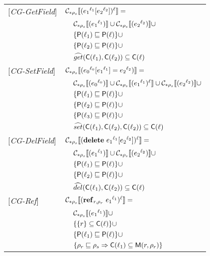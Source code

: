 \documentclass[[12pt,a4paper,twoside,openrigh]{report}
\begin{document}
\newpage
\begin{tabular} {l l l l}
{[\textit{CG-GetField}]}&\multicolumn{3}{l}{$\mathcal{C}_{*\rho_s}\llbracket ({e_1}^{\ell_1}[{e_2}^{\ell_2}])^\ell \rrbracket = $}\\
&&\multicolumn{2}{l}{$ \mathcal{C}_{*\rho_s}\llbracket ({e_1}^{\ell_1}) \rrbracket \cup \mathcal{C}_{*\rho_s}\llbracket ({e_2}^{\ell_2}) \rrbracket \cup$}\\
&&\multicolumn{2}{l}{$\{ \mathsf{P}(\ell_1) \sqsubseteq \mathsf{P}(\ell) \} \cup$} \\
&&\multicolumn{2}{l}{$\{ \mathsf{P}(\ell_2) \sqsubseteq \mathsf{P}(\ell) \} \cup$} \\
&&\multicolumn{2}{l}{$\widehat{get} (\mathsf{C}(\ell_1), \mathsf{C}(\ell_2)) \subseteq \mathsf{C}(\ell)$} \\
{[\textit{CG-SetField}]}&\multicolumn{3}{l}{$\mathcal{C}_{*\rho_s}\llbracket ({e_0}^{\ell_0}[{e_1}^{\ell_1}] = {e_2}^{\ell_2}) \rrbracket = $}\\
&&\multicolumn{2}{l}{$ \mathcal{C}_{*\rho_s}\llbracket ({e_0}^{\ell_0}) \rrbracket \cup \mathcal{C}_{*\rho_s}\llbracket ({e_1}^{\ell_1})^\ell \rrbracket \cup \mathcal{C}_{*\rho_s}\llbracket ({e_2}^{\ell_2}) \rrbracket \cup $}\\
&&\multicolumn{2}{l}{$\{ \mathsf{P}(\ell_1) \sqsubseteq \mathsf{P}(\ell) \} \cup$} \\
&&\multicolumn{2}{l}{$\{ \mathsf{P}(\ell_2) \sqsubseteq \mathsf{P}(\ell) \} \cup$} \\
&&\multicolumn{2}{l}{$\{ \mathsf{P}(\ell_3) \sqsubseteq \mathsf{P}(\ell) \} \cup$} \\
&&\multicolumn{2}{l}{$\widehat{set} (\mathsf{C}(\ell_1), \mathsf{C}(\ell_2), \mathsf{C}(\ell_2)) \subseteq \mathsf{C}(\ell)$} \\
{[\textit{CG-DelField}]}&\multicolumn{3}{l}{$\mathcal{C}_{*\rho_s}\llbracket (\mathbf{delete}\ {e_1}^{\ell_1}[{e_2}^{\ell_2}])^\ell \rrbracket = $}\\ 
&&\multicolumn{2}{l}{$ \mathcal{C}_{*\rho_s}\llbracket ({e_1}^{\ell_1}) \rrbracket \cup \mathcal{C}_{*\rho_s}\llbracket ({e_2}^{\ell_2}) \rrbracket \cup$}\\
&&\multicolumn{2}{l}{$\{ \mathsf{P}(\ell_1) \sqsubseteq \mathsf{P}(\ell) \} \cup$} \\
&&\multicolumn{2}{l}{$\{ \mathsf{P}(\ell_2) \sqsubseteq \mathsf{P}(\ell) \} \cup$} \\
&&\multicolumn{2}{l}{$\widehat{del} (\mathsf{C}(\ell_1), \mathsf{C}(\ell_2)) \subseteq \mathsf{C}(\ell)$}\\
{[\textit{CG-Ref}]}&\multicolumn{3}{l}{$ \mathcal{C}_{*\rho_s}\llbracket (\mathbf{ref}_{r,\rho_r}\ {e_1}^{\ell_1})^\ell \rrbracket = $}\\
&&\multicolumn{2}{l}{$\mathcal{C}_{*\rho_s}\llbracket ({e_1}^{\ell_1}) \rrbracket \cup $}\\
&&\multicolumn{2}{l}{$\{ \{r\} \subseteq \mathsf{C}(\ell) \} \cup$}\\
&&\multicolumn{2}{l}{$\{ \mathsf{P}(\ell_1) \sqsubseteq \mathsf{P}(\ell) \} \cup$}\\
&&\multicolumn{2}{l}{$\{ \rho_r \sqsubseteq \rho_s \Rightarrow \mathsf{C}(\ell_1) \subseteq \mathsf{M}(r, \rho_r) \} $}\\

\end{tabular}
\end{document}
